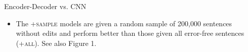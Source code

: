 \documentclass[final]{beamer}
\newlength{\onecolwid}
\newlength{\twocolwid}
\begin{document}
\begin{frame}[t]
\begin{columns}[t]
\begin{column}{\twocolwid}
\begin{columns}[t,totalwidth=\twocolwid]
\begin{column}{\onecolwid}
\begin{block}{Encoder-Decoder vs. CNN}
\begin{itemize}
                    \item The \textsc{+sample} models are given a random sample of 200,000 sentences without edits and perform better than those given all error-free sentences (\textsc{+all}). See also Figure 1.
                \end{itemize}
            \end{block}
        \end{column}
        \begin{column}{\onecolwid}\vspace{-.69in}


\end{column}
\end{columns}
\end{column}
\end{columns}
\end{frame}
\end{document}
